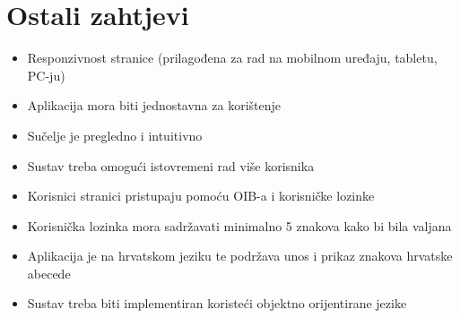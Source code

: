 		\section{Ostali zahtjevi}
			 
			 \begin{itemize}
			 	\item Responzivnost stranice (prilagođena za rad na mobilnom uređaju, tabletu, PC-ju)
			 	\item Aplikacija mora biti jednostavna za korištenje
			 	\item Sučelje je pregledno i intuitivno
			 	\item Sustav treba omogući istovremeni rad više korisnika
			 	\item Korisnici stranici pristupaju pomoću OIB-a i korisničke lozinke 
			 	\item Korisnička lozinka mora sadržavati minimalno 5 znakova kako bi bila valjana
			 	\item Aplikacija je na hrvatskom jeziku te podržava unos i prikaz znakova hrvatske abecede
			 	\item Sustav treba biti implementiran koristeći objektno orijentirane jezike
			 \end{itemize}
			 
			 
	